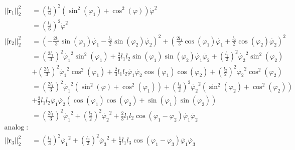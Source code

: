 \begin{align*}
	||\dot{\textbf{r}}_1||_2^2 &= \left(\frac{l_1}{6}\right)^2 (\sin^2(\varphi_1) + \cos^2(\varphi))\dot{\varphi}^2\\ 
	&= \left(\frac{l_1}{6}\right)^2\dot{\varphi}^2 \\
	||\dot{\textbf{r}}_2||_2^2 &= \left(-\frac{2l_1}{3}\sin(\varphi_1)\dot{\varphi_1} - \frac{l_2}{2}\sin(\varphi_2)\dot{\varphi_2}\right)^2
	+
	\left(\frac{2l_1}{3}\cos(\varphi_1)\dot{\varphi_1} + \frac{l_2}{2}\cos(\varphi_2)\dot{\varphi_2}\right)^2 \\
	&= \left(\frac{2l_1}{3}\right)^2\dot{\varphi_1}^2\sin^2(\varphi_1) + \frac{2}{3}l_1l_2\sin(\varphi_1)\sin(\varphi_2)\dot{\varphi_1}\dot{\varphi_2} + \left(\frac{l_2}{2}\right)^2\dot{\varphi_2}^2\sin^2(\varphi_2) \\
	&+ \left(\frac{2l_1}{3}\right)^2\dot{\varphi_1}^2\cos^2(\varphi_1) + \frac{2}{3}l_1l_2\dot{\varphi_1}\dot{\varphi_2}\cos(\varphi_1)\cos(\varphi_2) + \left(\frac{l_2}{2}\right)^2\dot{\varphi_2}^2\cos^2(\varphi_2) \\
	&= \left(\frac{2l_1}{3}\right)^2\dot{\varphi_1}^2\left(\sin^2(\varphi) + \cos^2(\varphi_1)\right) + \left(\frac{l_2}{2}\right)^2\dot{\varphi_2}^2\left(\sin^2(\varphi_2) + \cos^2(\varphi_2)\right) \\
	&+ \frac{2}{3}l_1l_2\dot{\varphi_1}\dot{\varphi_2}\left(\cos(\varphi_1)\cos(\varphi_2) + \sin(\varphi_1)\sin(\varphi_2)\right) \\
	&=  \left(\frac{2l_1}{3}\right)^2\dot{\varphi_1}^2 + \left(\frac{l_2}{2}\right)^2\dot{\varphi_2}^2 + \frac{2}{3}l_1l_2\cos(\varphi_1 - \varphi_2)\dot{\varphi_1}\dot{\varphi_2} \\
	\text{analog dazu}: \\
	||\dot{\textbf{r}}_3||_2^2 &= \left(\frac{l_1}{3}\right)^2\dot{\varphi_1}^2 + \left(\frac{l_3}{2}\right)^2\dot{\varphi_3}^2 + \frac{1}{3}l_1l_3\cos(\varphi_1 - \varphi_3)\dot{\varphi_1}\dot{\varphi_3}
\end{align*}